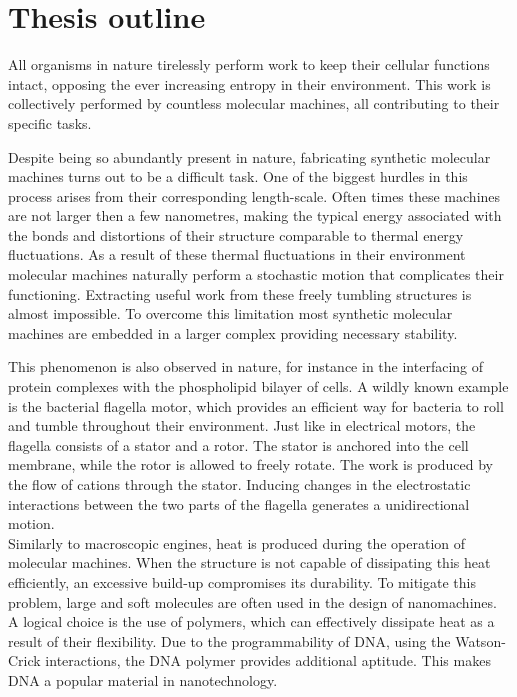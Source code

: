 \section{Thesis outline}

All organisms in nature tirelessly perform work to keep their cellular functions
intact, opposing the ever increasing entropy in their environment. This work is
collectively performed by countless molecular machines, all contributing to
their specific tasks.

Despite being so abundantly present in nature, fabricating synthetic molecular machines
turns out to be a difficult task. One of the biggest hurdles in this process arises from
their corresponding length-scale. Often times these machines are not larger then
a few nanometres, making the typical energy associated with the bonds and
distortions of their structure comparable to thermal energy fluctuations. As a result of
these thermal fluctuations in their environment molecular machines naturally perform
a stochastic motion that complicates their functioning.  Extracting useful work from
these freely tumbling structures is almost impossible. To overcome this limitation most
synthetic molecular machines are embedded in a larger complex providing necessary
stability.\cite{Watson2016}

This phenomenon is also observed in nature, for instance in the interfacing of protein
complexes with the phospholipid bilayer of cells.  A wildly known example is the
bacterial flagella motor, which provides an efficient way for bacteria to
roll and tumble throughout their environment. Just like in electrical motors, the
flagella consists of a stator and a rotor. The stator is anchored into the cell membrane,
while the rotor is allowed to freely rotate. The work is produced by the flow of cations
through the stator. Inducing changes in the electrostatic interactions between the two
parts of the flagella generates a unidirectional motion.\cite{sowa_berry_2008}\\

Similarly to macroscopic engines, heat is produced during the operation of molecular
machines. When the structure is not capable of dissipating this heat efficiently, an
excessive build-up compromises its durability. To mitigate this problem, large and soft
molecules are often used in the design of nanomachines. A logical choice
is the use of polymers, which can effectively dissipate heat as a result of their
flexibility.  Due to the programmability of DNA, using the Watson-Crick interactions,
the DNA polymer provides additional aptitude. This makes DNA a popular material in
nanotechnology.

